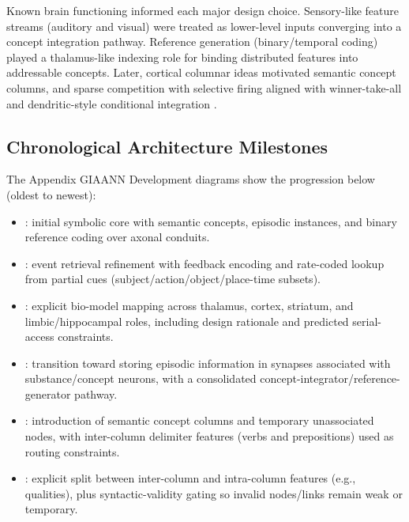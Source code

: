 Known brain functioning informed each major design choice. Sensory-like feature streams (auditory
and visual) were treated as lower-level inputs converging into a concept integration pathway.
Reference generation (binary/temporal coding) played a thalamus-like indexing role for binding
distributed features into addressable concepts. Later, cortical columnar ideas motivated semantic
concept columns, and sparse competition with selective firing aligned with winner-take-all and
dendritic-style conditional integration \citep{mountcastle1997columnar,london2005dendriticComputation,maass2000winnerTakeAll}.

\subsection{Chronological Architecture Milestones}

The Appendix  GIAANN Development diagrams show the progression below (oldest to newest):

\begin{itemize}
    \item {}: initial symbolic core with semantic concepts, episodic instances, and binary reference coding over axonal conduits.
    \item {}: event retrieval refinement with feedback encoding and rate-coded lookup from partial cues (subject/action/object/place-time subsets).
    \item {}: explicit bio-model mapping across thalamus, cortex, striatum, and limbic/hippocampal roles, including design rationale and predicted serial-access constraints.
    \item {}: transition toward storing episodic information in synapses associated with substance/concept neurons, with a consolidated concept-integrator/reference-generator pathway.
    \item {}: introduction of semantic concept columns and temporary unassociated nodes, with inter-column delimiter features (verbs and prepositions) used as routing constraints.
    \item {}: explicit split between inter-column and intra-column features (e.g., qualities), plus syntactic-validity gating so invalid nodes/links remain weak or temporary.
\end{itemize}

